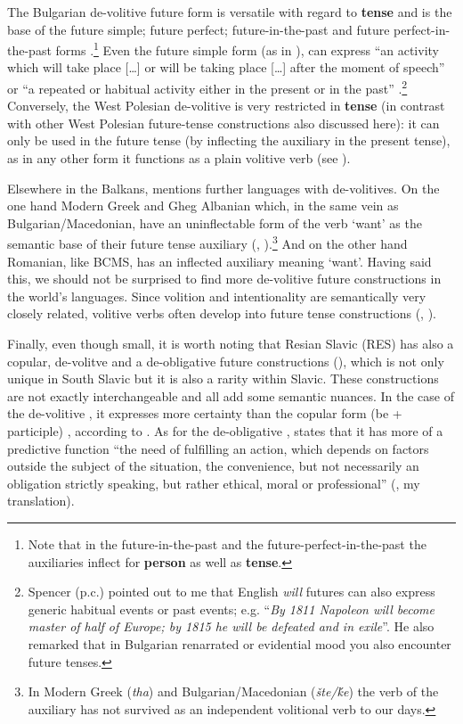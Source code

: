 \documentclass[output=paper,colorlinks,citecolor=brown]{langscibook}
\begin{document}
The Bulgarian de-volitive future form is versatile with regard to \textbf{tense }and is the base of the future simple; future perfect; future-in-the-past and future perfect-in-the-past forms \citep[209--212]{Kuteva1995}.\footnote{Note that in the future-in-the-past and the future-perfect-in-the-past the auxiliaries inflect for \textbf{person }as well as \textbf{tense}.} Even the future simple form (as in ), can express “an activity which will take place […] or will be taking place […] after the moment of speech” or “a repeated or habitual activity either in the present or in the past” \citep[209]{Kuteva1995}.\footnote{Spencer (p.c.) pointed out to me that English \textit{will} futures can also express generic habitual events or past events; e.g. “\textit{By 1811 Napoleon will become master of half of Europe; by 1815 he will be defeated and in exile}”. He also remarked that in Bulgarian renarrated or evidential mood you also encounter future tenses.} Conversely, the West Polesian de-volitive is very restricted in \textbf{tense} (in contrast with other West Polesian future-tense constructions also discussed here): it can only be used in the future tense (by inflecting the auxiliary in the present tense), as in any other form it functions as a plain volitive verb (see ).

Elsewhere in the Balkans, \citet[323]{Dahl2000b} mentions further languages with de-volitives. On the one hand Modern Greek and Gheg Albanian which, in the same vein as Bulgarian/Macedonian, have an uninflectable form of the verb ‘want’ as the semantic base of their future tense auxiliary (\citealt[257]{Duchet1995}, \citealt[233]{Hedin1995}).\footnote{In Modern Greek (\textit{tha}) and Bulgarian/Macedonian (\textit{šte/ḱe}) the verb of the auxiliary has not survived as an independent volitional verb to our days.} And on the other hand Romanian, like BCMS, has an inflected auxiliary meaning ‘want’. Having said this, we should not be surprised to find more de-volitive future constructions in the world’s languages. Since volition and intentionality are semantically very closely related, volitive verbs often develop into future tense constructions (\cite{Bybee1985}, \cite{BybeeDahl1989}).

Finally, even though small, it is worth noting that Resian Slavic (RES) has also a copular, de-volitve and a de-obligative future constructions (\cite{Pila2022}), which is not only unique in South Slavic but it is also a rarity within Slavic. These constructions are not exactly interchangeable and all add some semantic nuances. In the case of the de-volitive , it expresses more certainty than the copular form (be + participle) , according to \citet[38]{Pila2022}. As for the de-obligative , \citet[41]{Pila2022} states that it has more of a predictive function “the need of fulfilling an action, which depends on factors outside the subject of the situation, the convenience, but not necessarily an obligation strictly speaking, but rather ethical, moral or professional” (\citealt[41]{Pila2022}, my translation). 
\end{document}
